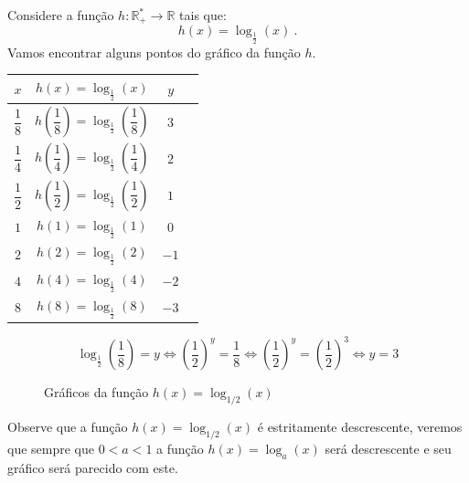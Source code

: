  \begin{exem} \label{ex:log-1/2}
    Considere a função $h: \mathbb{R_{+}^{*}} \rightarrow \mathbb{R} $ tais que:
 \[h(x) = \log_{\frac{1}{2}}(x) \ .\]
 Vamos encontrar alguns pontos do gráfico da função $h$.
 
  \begin{table}[H]
 \centering
 \begin{tabular}{|c|c|c|c|} \hline
 \rowcolor{cinza}
 $x$ & $h(x) = \log_{\frac{1}{2}}(x)$ & $y$ \\ \hline
 $\dfrac{1}{8}$ & $h\left(\dfrac{1}{8}\right)= \log_{\frac{1}{2}}\left(\dfrac{1}{8}\right)$ & $3$ \\ \hline
 $\dfrac{1}{4}$ & $h\left(\dfrac{1}{4}\right)= \log_{\frac{1}{2}}\left(\dfrac{1}{4}\right)$ & $2$ \\ \hline
 $\dfrac{1}{2}$ & $h\left(\dfrac{1}{2}\right)= \log_{\frac{1}{2}}\left(\dfrac{1}{2}\right)$ & $1$ \\ \hline
 $1$ & $h(1)= \log_{\frac{1}{2}}(1)$ & $0$ \\ \hline
 $2$ & $h(2)= \log_{\frac{1}{2}}(2)$ & $-1$ \\ \hline
 $4$ & $h(4)= \log_{\frac{1}{2}}(4)$ & $-2$ \\ \hline
 $8$ & $h(8)= \log_{\frac{1}{2}}(8)$ & $-3$ \\ \hline
 \end{tabular}
 \end{table}
 
 \[\log_{\frac{1}{2}}\left(\dfrac{1}{8}\right)= y \Leftrightarrow \left(\dfrac{1}{2}\right)^y= \dfrac{1}{8} \Leftrightarrow \left(\dfrac{1}{2}\right)^y= \left(\dfrac{1}{2}\right)^{3} \Leftrightarrow y=3\]
 
 
 \begin{figure}[H]
    \centering
    \caption{Gráficos da função $h(x)= \log_{1/2}(x)$}
   \end{figure}
 Observe que a função $h(x)= \log_{1/2}(x)$ é estritamente descrescente, veremos que sempre que $0< a< 1$ a função $h(x)= \log_{a}(x)$ será descrescente e seu gráfico será parecido com este.
 \end{exem}
 
